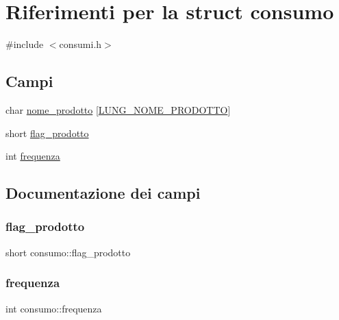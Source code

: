 \hypertarget{structconsumo}{}\section{Riferimenti per la struct consumo}
\label{structconsumo}


{\ttfamily \#include $<$consumi.\+h$>$}

\subsection*{Campi}
\begin{DoxyCompactItemize}
\item 
char \hyperlink{structconsumo_a789a4460ab0162e2732058229c5a437f}{nome\+\_\+prodotto} \mbox{[}\hyperlink{consumi_8h_aac906bc404d4143a882b5d18fe2e907e}{L\+U\+N\+G\+\_\+\+N\+O\+M\+E\+\_\+\+P\+R\+O\+D\+O\+T\+TO}\mbox{]}
\item 
short \hyperlink{structconsumo_a783bdbbbbea7498aeb2a014d0d4597a9}{flag\+\_\+prodotto}
\item 
int \hyperlink{structconsumo_a4d5512b0cb9f581024f3c36fa0a2d44a}{frequenza}
\end{DoxyCompactItemize}


\subsection{Documentazione dei campi}
\mbox{\label{structconsumo_a783bdbbbbea7498aeb2a014d0d4597a9}} 
\subsubsection{\texorpdfstring{flag\+\_\+prodotto}{flag\_prodotto}}
{\footnotesize\ttfamily short consumo\+::flag\+\_\+prodotto}

\mbox{\label{structconsumo_a4d5512b0cb9f581024f3c36fa0a2d44a}} 
\subsubsection{\texorpdfstring{frequenza}{frequenza}}
{\footnotesize\ttfamily int consumo\+::frequenza}

\mbox{\label{structconsumo_a789a4460ab0162e2732058229c5a437f}} 
